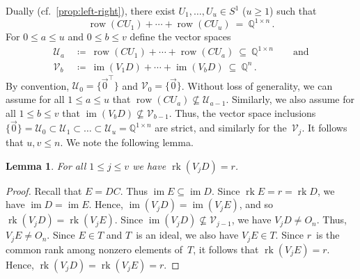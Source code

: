 \documentclass{lmcs}
\newtheorem{lemma}[thm]{Lemma}
\theoremstyle{definition}
\DeclareMathOperator{\im}{im}
\DeclareMathOperator{\row}{row}
\newcommand{\rk}{\operatorname{rk}}
\newcommand{\Q}{\mathbb{Q}}
\newcommand{\U}{\mathcal{U}}
\newcommand{\V}{\mathcal{V}}
\begin{document}
Dually (cf.\ \cref{prop:left-right}), there exist $U_1, \ldots, U_u \in S^1$ ($u \ge 1$) such that
\[
 \row(C U_1) + \cdots + \row(C U_u) \ = \ \Q^{1 \times n}\,. 
\]
For $0 \le a \le u$ and $0 \le b \le v$ define the vector spaces
\begin{align*}
 \U_{a} \ &\coloneqq \ \row(C U_1) + \cdots + \row(C U_{a}) \ \subseteq \ \Q^{1 \times n} \qquad \text{and} \\
 \V_{b} \ &\coloneqq \ \im(V_1 D) + \cdots + \im(V_{b} D) \ \subseteq \ \Q^n\,.
\end{align*}
By convention, $\U_0 = \{\vec{0}^\top\}$ and $\V_0 = \{\vec{0}\}$.
Without loss of generality, we can assume for all $1 \le a \le u$ that $\row(C U_a) \not\subseteq \U_{a-1}$.
Similarly, we also assume for all $1 \le b \le v$ that $\im(V_b D) \not\subseteq \V_{b-1}$. Thus, the vector space inclusions $\{\vec{0}\} = \U_0 \subset \U_1 \subset \ldots \subset \U_u = \Q^{1 \times n}$ are strict, and similarly for the~$\V_j$.
It follows that $u, v \le n$.
We note the following lemma.
\begin{lemma} \label{lem:rk-VjD}
For all $1 \le j \le v$ we have $\rk(V_j D) = r$.
\end{lemma}
\begin{proof}
Recall that $E = D C$.
Thus $\im E \subseteq \im D$.
Since $\rk E = r = \rk D$, we have $\im D = \im E$.
Hence, $\im (V_j D) = \im (V_j E)$, and so $\rk (V_j D) = \rk (V_j E)$.
Since $\im(V_j D) \not\subseteq \V_{j-1}$, we have $V_j D \ne O_n$.
Thus, $V_j E \ne O_n$.
Since $E \in T$ and $T$~is an ideal, we also have $V_j E \in T$.
Since $r$~is the common rank among nonzero elements of~$T$, it follows that $\rk (V_j E) = r$.
Hence, $\rk (V_j D) = \rk (V_j E) = r$.
\end{proof}
\end{document}
